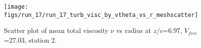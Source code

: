 \begin{figure}[H]
\centering
\texttt{[image: figs/run\_17/run\_17\_turb\_visc\_by\_vtheta\_vs\_r\_meshscatter]}
\caption{Scatter plot of mean total viscosity $\nu$ vs radius at $z/c$=6.97, $V_{free}$=27.03, station 2.}
\label{fig:run_17_turb_visc_by_vtheta_vs_r_meshscatter}
\end{figure}


